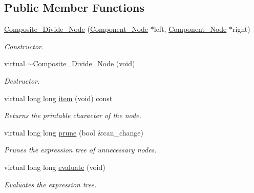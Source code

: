 \subsection*{Public Member Functions}
\begin{DoxyCompactItemize}
\item 
\hyperlink{classMadara_1_1Expression__Tree_1_1Composite__Divide__Node_a9607b6e0327a6239adac3f4b3a86233d}{Composite\_\-Divide\_\-Node} (\hyperlink{classMadara_1_1Expression__Tree_1_1Component__Node}{Component\_\-Node} $\ast$left, \hyperlink{classMadara_1_1Expression__Tree_1_1Component__Node}{Component\_\-Node} $\ast$right)
\begin{DoxyCompactList}\small\item\em Constructor. \item\end{DoxyCompactList}\item 
virtual \hyperlink{classMadara_1_1Expression__Tree_1_1Composite__Divide__Node_adf20b4b87f6626d612c1fc42103e3f1d}{$\sim$Composite\_\-Divide\_\-Node} (void)
\begin{DoxyCompactList}\small\item\em Destructor. \item\end{DoxyCompactList}\item 
virtual long long \hyperlink{classMadara_1_1Expression__Tree_1_1Composite__Divide__Node_a2cf5cf3ec9d7fdcdb558c4ead02b34df}{item} (void) const 
\begin{DoxyCompactList}\small\item\em Returns the printable character of the node. \item\end{DoxyCompactList}\item 
virtual long long \hyperlink{classMadara_1_1Expression__Tree_1_1Composite__Divide__Node_a8cfb96a567df6afb30935d27c92cdcca}{prune} (bool \&can\_\-change)
\begin{DoxyCompactList}\small\item\em Prunes the expression tree of unnecessary nodes. \item\end{DoxyCompactList}\item 
virtual long long \hyperlink{classMadara_1_1Expression__Tree_1_1Composite__Divide__Node_afbb60cd9bc4730f41f0bb0e89282a758}{evaluate} (void)
\begin{DoxyCompactList}\small\item\em Evaluates the expression tree. \item\end{DoxyCompactList}\item 

\end{DoxyCompactItemize}
